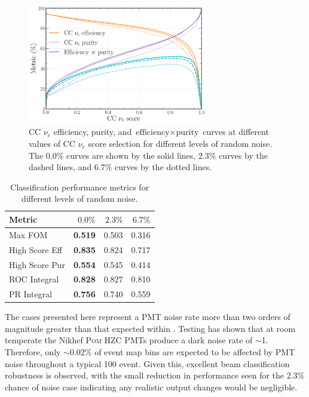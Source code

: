\begin{figure} %
    \includegraphics[width=0.7\textwidth]{diagrams/7-results/calib_noise_nuel_eff_curves.pdf}
    \caption[CC $\nu_{e}$ efficiency and purity curves for different levels of random noise]
    {CC $\nu_{e}$ efficiency, purity, and $\text{efficiency}\times\text{purity}$ curves at
        different values of CC $\nu_{e}$ score selection for different levels of random noise. The
        $0.0\%$ curves are shown by the solid lines, $2.3\%$ curves by the dashed lines, and
        $6.7\%$ curves by the dotted lines.}
    \label{fig:calib_noise_nuel_eff_curves}
\end{figure}

\begin{table} %
    \begin{tabular}{lrrr}
        Metric         & $0.0\%$        & $2.3\%$ & $6.7\%$ \\
        \midrule
        Max FOM        & \textbf{0.519} & 0.503   & 0.316   \\
        High Score Eff & \textbf{0.835} & 0.824   & 0.717   \\
        High Score Pur & \textbf{0.554} & 0.545   & 0.414   \\
        ROC Integral   & \textbf{0.828} & 0.827   & 0.810   \\
        PR Integral    & \textbf{0.756} & 0.740   & 0.559   \\
    \end{tabular}
    \caption[Classification performance metrics for different levels of random noise]
    {Classification performance metrics for different levels of random noise.}
    \label{tab:calib_noise}
\end{table}

The cases presented here represent a PMT noise rate more than two orders of magnitude greater than
that expected within \chipsfive. Testing has shown that at room temperate the Nikhef \textsc{Pom}
HZC PMTs produce a dark noise rate of $\sim$\SI{1}{}. Therefore, only $\sim0.02\%$ of
event map bins are expected to be affected by PMT noise throughout a typical \SI{100}{}
event. Given this, excellent beam classification robustness is observed, with the small reduction
in performance seen for the $2.3\%$ chance of noise case indicating any realistic output changes
would be negligible.

